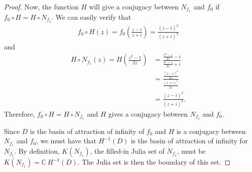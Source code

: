 \begin{proof}
  Now, the function $H$ will give a conjugacy between $N_{f_1}$ and $f_0$ if $f_0 \circ H = H \circ N_{f_1}$.
  We can easily verify that
  \begin{align*}
    f_0 \circ H (z) = f_0\left(\frac{z-i}{z+i}\right) = \frac{(z-i)^2}{(z+i)^2}
  \end{align*}
  and
  \begin{align*}
    H \circ N_{f_1}(z) = H\left(\frac{z^2-1}{2z}\right) &= \frac{\frac{z^2-1}{2z} - i}{\frac{z^2-1}{2z}+i} \\
    &= \frac{\frac{(z-i)^2}{2z}}{\frac{(z+i)^2}{2z}} \\
    &= \frac{(z-i)^2}{(z+i)^2}.
  \end{align*}
  Therefore, $f_0 \circ H = H \circ N_{f_1}$ and $H$ gives a conjugacy between $N_{f_1}$ and $f_0$.

  Since $D$ is the basin of attraction of infinity of $f_0$ and $H$ is a conjugacy between $N_{f_1}$ and $f_0$,
  we must have that $H^{-1}(D)$ is the basin of attraction of infinity for $N_{f_1}$. By definition, $K(N_{f_1})$,
  the filled-in Julia set of $N_{f_1}$, must be $K(N_{f_1}) = \mathbb{C} \ H^{-1}(D)$. The Julia set is then the
  boundary of this set.

\end{proof}
\newpage
